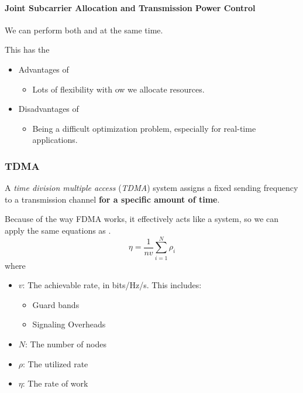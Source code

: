 \paragraph{Joint Subcarrier Allocation and Transmission Power Control}\label{par:Joint_Subcarrier_Transmission_Power}
We can perform both  and  at the same time.

This has the
\begin{itemize}[noitemsep]
\item Advantages of
  \begin{itemize}[noitemsep]
  \item Lots of flexibility with ow we allocate resources.
  \end{itemize}

\item Disadvantages of
  \begin{itemize}[noitemsep]
  \item Being a difficult optimization problem, especially for real-time applications.
  \end{itemize}
\end{itemize}

\subsubsection{TDMA}\label{subsubsec:TDMA}
\begin{definition}\label{def:TDMA}
  A \emph{time division multiple access}  (\emph{TDMA}) system assigns a fixed sending frequency to a transmission channel \textbf{for a specific amount of time}.

  Because of the way FDMA works, it effectively acts like a  system, so we can apply the same equations as .
  \begin{equation}\label{eq:TDMA_Work_Rate}
    \eta = \frac{1}{n v} \sum\limits_{i=1}^{N} \rho_{i}
  \end{equation}
  where
  \begin{itemize}[noitemsep]
  \item $v$: The achievable rate, in bits/Hz/s. This includes:
    \begin{itemize}[noitemsep]
    \item Guard bands
    \item Signaling Overheads
    \end{itemize}
  \item $N$: The number of nodes
  \item $\rho$: The utilized rate
  \item $\eta$: The rate of work
  \end{itemize}
\end{definition}

